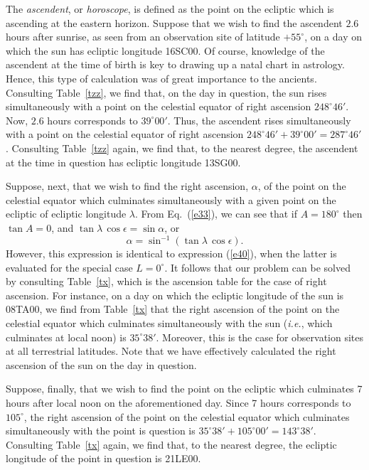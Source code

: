 The {\em ascendent}, or  {\em horoscope}, is defined as the point on the ecliptic which is ascending at the eastern horizon.
 Suppose that we wish to find the  ascendent $2.6$ hours after 
 sunrise, as seen from an observation site of latitude $+55^\circ$, on a day
 on which the sun has ecliptic longitude 16SC00. Of course, knowledge
 of the ascendent at the time of birth is key to drawing up a natal chart
 in astrology. Hence, this type of calculation was of great importance to the ancients. 
 Consulting Table~\ref{tzz}, we find that, on the day in question, the sun rises simultaneously with a point on the celestial equator of
 right ascension $248^\circ 46'$. Now, $2.6$ hours corresponds to
 $39^\circ00'$. Thus, the ascendent rises simultaneously with a point
 on the celestial equator of right ascension $248^\circ 46' + 39^\circ00'=
 287^\circ 46'$. Consulting Table~\ref{tzz} again, we find that, to the
 nearest degree, the ascendent at the time in question has ecliptic longitude 13SG00. 
 
Suppose, next, that we wish to find the right ascension, $\alpha$, of the point on the celestial equator
which culminates simultaneously with a given point on the ecliptic of
ecliptic longitude $\lambda$.
From Eq.~(\ref{e33}), we can see that if $A=180^\circ$ then
$\tan A = 0$, and $\tan\lambda\,\cos \epsilon = \sin \alpha$, or
\begin{equation}
\alpha  = \sin ^{-1}(\tan \lambda\,\cos\epsilon).
\end{equation}
However, this expression is identical to expression (\ref{e40}),
when the latter is evaluated for the special case $L=0^\circ$. It follows
that our problem can be solved by consulting Table~\ref{tx}, which is the
ascension table for the case of right ascension. For instance, on a day on which the ecliptic
longitude of the sun is 08TA00, we find from Table~\ref{tx} that
the right ascension of the point on the celestial equator which culminates
simultaneously with the sun ({\em i.e.}, which culminates at local noon) is $35^\circ38'$. Moreover, this is the case
for observation sites at all terrestrial latitudes. Note that we have effectively
calculated the right ascension of the sun on the day in question.

Suppose, finally, that we wish to find the  point on the
ecliptic which culminates 7 hours after local noon on the
aforementioned day. Since 7 hours corresponds to $105^\circ$, the
right ascension of the point on the celestial equator which culminates
simultaneously with the point is question is $35^\circ 38' + 105^\circ00'= 
 143^\circ 38'$. Consulting Table~\ref{tx} again, we find that, to the nearest degree,  the
 ecliptic longitude of the point in question is 21LE00.
 
